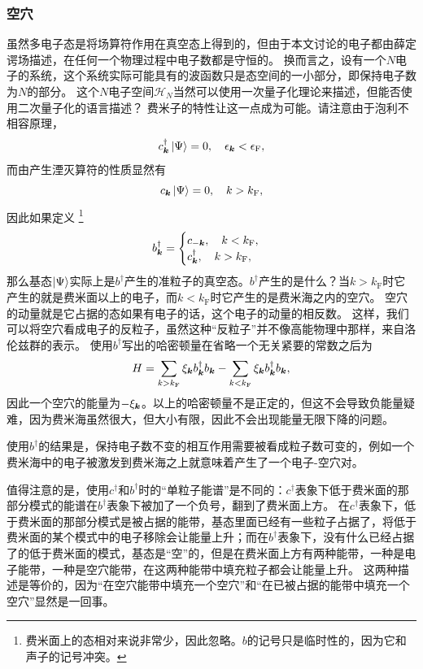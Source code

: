 \subsubsection{空穴} 

虽然多电子态是将场算符作用在真空态上得到的，但由于本文讨论的电子都由薛定谔场描述，在任何一个物理过程中电子数都是守恒的。
换而言之，设有一个$N$电子的系统，这个系统实际可能具有的波函数只是态空间的一小部分，即保持电子数为$N$的部分。
这个$N$电子空间$\mathcal{H}_N$当然可以使用一次量子化理论来描述，但能否使用二次量子化的语言描述？
费米子的特性让这一点成为可能。请注意由于泡利不相容原理，
\[
    {c}^\dagger_{\vb*{k}} \ket{\Psi} = 0, \quad \epsilon_{\vb*{k}} < \epsilon_\text{F},
\]
而由产生湮灭算符的性质显然有
\[
    {c}_{\vb*{k}} \ket{\Psi} = 0, \quad k > k_\text{F},
\]
因此如果定义%
\footnote{费米面上的态相对来说非常少，因此忽略。$b$的记号只是临时性的，因为它和声子的记号冲突。}%
\begin{equation}
    {b}^\dagger_{\vb*{k}} = \begin{cases}
        {c}_{-\vb*{k}}, \quad k < k_\text{F}, \\
        {c}_{\vb*{k}}^\dagger, \quad k > k_\text{F},
    \end{cases}
\end{equation}
那么基态$\ket{\Psi}$实际上是${b}^\dagger$产生的准粒子的真空态。${b}^\dagger$产生的是什么？当$k>k_\text{F}$时它产生的就是费米面以上的电子，而$k<k_\text{F}$时它产生的是费米海之内的空穴。
空穴的动量就是它占据的态如果有电子的话，这个电子的动量的相反数。%
这样，我们可以将空穴看成电子的反粒子，虽然这种“反粒子”并不像高能物理中那样，来自洛伦兹群的表示。
使用${b}^\dagger$写出的哈密顿量在省略一个无关紧要的常数之后为
\begin{equation}
    {H} = \sum_{k > k_\text{F}} \xi_{\vb*{k}} {b}^\dagger_{\vb*{k}} {b}_{\vb*{k}} - \sum_{k < k_\text{F}} \xi_{\vb*{k}} {b}^\dagger_{\vb*{k}} {b}_{\vb*{k}},
    \label{eq:particle-and-hole-hamiltonian}
\end{equation}
因此一个空穴的能量为$-\xi_{\vb*{k}}$。以上的哈密顿量不是正定的，但这不会导致负能量疑难，因为费米海虽然很大，但大小有限，因此不会出现能量无限下降的问题。

使用${b}^\dagger$的结果是，保持电子数不变的相互作用需要被看成粒子数可变的，例如一个费米海中的电子被激发到费米海之上就意味着产生了一个电子-空穴对。

值得注意的是，使用$c^\dagger$和$b^\dagger$时的“单粒子能谱”是不同的：$c^\dagger$表象下低于费米面的那部分模式的能谱在$b^\dagger$表象下被加了一个负号，翻到了费米面上方。
在$c^\dagger$表象下，低于费米面的那部分模式是被占据的能带，基态里面已经有一些粒子占据了，将低于费米面的某个模式中的电子移除会让能量上升；而在$b^\dagger$表象下，没有什么已经占据了的低于费米面的模式，基态是“空”的，但是在费米面上方有两种能带，一种是电子能带，一种是空穴能带，在这两种能带中填充粒子都会让能量上升。
这两种描述是等价的，因为“在空穴能带中填充一个空穴”和“在已被占据的能带中填充一个空穴”显然是一回事。

